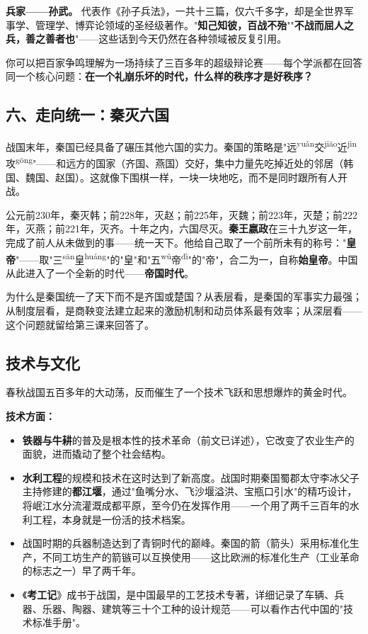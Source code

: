 \documentclass[a4paper,12pt]{ctexart}
\newcommand{\ruby}[2]{#1\textsuperscript{#2}}
\begin{document}
\textbf{兵家——孙武。} 代表作《孙子兵法》，一共十三篇，仅六千多字，却是全世界军事学、管理学、博弈论领域的圣经级著作。"\textbf{知己知彼，百战不殆}""\textbf{不战而屈人之兵，善之善者也}"——这些话到今天仍然在各种领域被反复引用。

你可以把百家争鸣理解为一场持续了三百多年的超级辩论赛——每个学派都在回答同一个核心问题：\textbf{在一个礼崩乐坏的时代，什么样的秩序才是好秩序？}

\subsection*{六、走向统一：秦灭六国}

战国末年，秦国已经具备了碾压其他六国的实力。秦国的策略是"\ruby{远}{yuǎn}\ruby{交}{jiāo}\ruby{近}{jìn}\ruby{攻}{gōng}"——和远方的国家（齐国、燕国）交好，集中力量先吃掉近处的邻居（韩国、魏国、赵国）。这就像下围棋一样，一块一块地吃，而不是同时跟所有人开战。

公元前230年，秦灭韩；前228年，灭赵；前225年，灭魏；前223年，灭楚；前222年，灭燕；前221年，灭齐。十年之内，六国尽灭。\textbf{秦王嬴政}在三十九岁这一年，完成了前人从未做到的事——统一天下。他给自己取了一个前所未有的称号："\textbf{皇帝}"——取"\ruby{三}{sān}\ruby{皇}{huáng}"的"皇"和"\ruby{五}{wǔ}\ruby{帝}{dì}"的"帝"，合二为一，自称\textbf{始皇帝}。中国从此进入了一个全新的时代——\textbf{帝国时代}。

为什么是秦国统一了天下而不是齐国或楚国？从表层看，是秦国的军事实力最强；从制度层看，是商鞅变法建立起来的激励机制和动员体系最有效率；从深层看——这个问题就留给第三课来回答了。

\subsection*{技术与文化}

春秋战国五百多年的大动荡，反而催生了一个技术飞跃和思想爆炸的黄金时代。

\textbf{技术方面：}
\begin{itemize}
  \item \textbf{铁器与牛耕}的普及是根本性的技术革命（前文已详述），它改变了农业生产的面貌，进而撬动了整个社会结构。
  \item \textbf{水利工程}的规模和技术在这时达到了新高度。战国时期秦国蜀郡太守李冰父子主持修建的\textbf{都江堰}，通过"鱼嘴分水、飞沙堰溢洪、宝瓶口引水"的精巧设计，将岷江水分流灌溉成都平原，至今仍在发挥作用——一个用了两千三百年的水利工程，本身就是一份活的技术档案。
  \item 战国时期的兵器制造达到了青铜时代的巅峰。秦国的箭（箭头）采用标准化生产，不同工坊生产的箭镞可以互换使用——这比欧洲的标准化生产（工业革命的标志之一）早了两千年。
  \item 《\textbf{考工记}》成书于战国，是中国最早的工艺技术专著，详细记录了车辆、兵器、乐器、陶器、建筑等三十个工种的设计规范——可以看作古代中国的"技术标准手册"。
\end{itemize}
\end{document}
